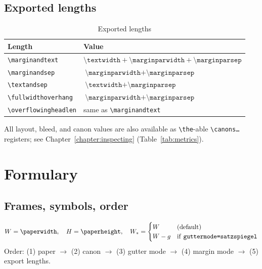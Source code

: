 \documentclass[11pt, twoside, openany]{book}
\newcommand{\cmd}[1]{\texttt{\textbackslash #1}}
\begin{document}
\section{Exported lengths}\label{sec:lengths}

\begin{table}
	\centering
	\caption{Exported lengths}
	\label{tab:exportlengths}
	\begin{tabular}{ll}
		\textbf{Length}          & \textbf{Value}                                                \\
		\hline
		\cmd{marginandtext}      & $\cmd{textwidth} + \cmd{marginparwidth} + \cmd{marginparsep}$ \\
		\cmd{marginandsep}       & $\cmd{marginparwidth} + \cmd{marginparsep}$                   \\
		\cmd{textandsep}         & $\cmd{textwidth} + \cmd{marginparsep}$                        \\
		\cmd{fullwidthoverhang}  & $\cmd{marginparwidth} + \cmd{marginparsep}$                   \\
		\cmd{overflowingheadlen} & same as \cmd{marginandtext}                                   \\
	\end{tabular}
\end{table}

All layout, bleed, and canon values are also available as \cmd{the}-able \texttt{\textbackslash canons\ldots} registers; see Chapter~\ref{chapter:inspecting} (Table~\ref{tab:metrics}).

\printbibliography


\appendix
\chapter{Formulary}\label{chapter:formulary}


\section*{Frames, symbols, order}\label{sec:formulary1}
\[
	W = \cmd{paperwidth},\quad H = \cmd{paperheight},\quad
	W_\ast = \begin{cases}
	W & \text{(default)}\\
	W-g & \text{if \texttt{guttermode=satzspiegel}}
	\end{cases}
\]
Order: (1) paper $\to$ (2) canon $\to$ (3) gutter mode $\to$ (4) margin mode $\to$ (5) export lengths.
\end{document}
